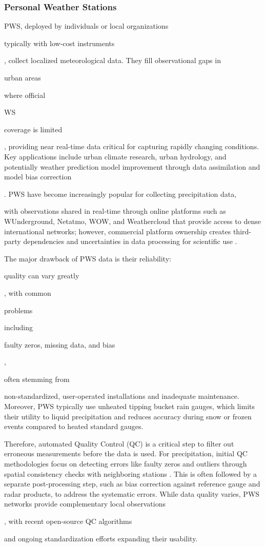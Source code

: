 \documentclass[manuscript]{copernicus}
\newif\ifshowrevisions
\newcommand{\blue}[1]{%
  \ifshowrevisions
    \textcolor{black}{#1}%
  \else
    #1%
  \fi
}
\begin{document}
\subsubsection{Personal Weather Stations}
PWS, deployed by individuals or local organizations \blue{typically with low-cost instruments}, collect localized meteorological data. They fill observational gaps in \blue{urban areas} where official \blue{WS} coverage is limited\blue{, providing near real-time data critical for capturing rapidly changing conditions. Key applications include urban climate research, urban hydrology, and potentially weather prediction model improvement through data assimilation and model bias correction \citep{bardossy2020use,brousse2022bias,de2017potential}}.
PWS have become increasingly popular for collecting precipitation data, \blue{with observations shared in real-time through online platforms such as WUnderground, Netatmo, WOW, and Weathercloud that provide access to dense international networks; however, commercial platform ownership creates third-party dependencies and uncertainties in data processing for scientific use \citep{fencl2023data}.} 
\blue{The major drawback of PWS data is their reliability:} quality can vary greatly\blue{, with common} problems \blue{including} faulty zeros, missing data, and bias\blue{,} often stemming from \blue{non-standardized, user-operated installations and inadequate maintenance. Moreover, PWS typically use unheated tipping bucket rain gauges, which limits their utility to liquid precipitation and reduces accuracy during snow or frozen events compared to heated standard gauges.} 
\blue{Therefore, automated Quality Control (QC) is a critical step to filter out erroneous measurements before the data is used. For precipitation, initial QC  methodologies focus on detecting errors like faulty zeros and outliers through spatial consistency checks with neighboring stations \citep{de2019quality, el2024guide, el2023overview}. This is often followed by a separate post-processing step, such as bias correction against reference gauge and radar products, to address the systematic errors. 
While data quality varies, PWS networks provide complementary local observations\blue{, with recent open-source QC algorithms~\citep{cosmo2025apocs}} and ongoing standardization efforts expanding their usability.}
\end{document}
